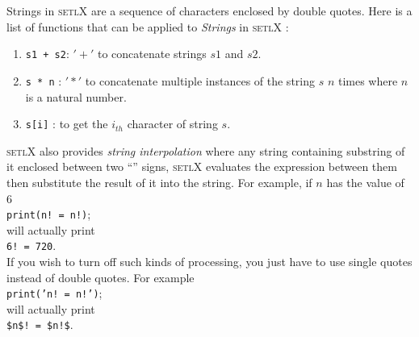 \documentclass[11pt]{article}
\begin{document}
Strings in \textsc{setlX} are a sequence of characters enclosed by double quotes. Here is a list of functions that can be applied to \textsl{Strings} in \textsc{setlX} :
\begin{enumerate}
\item \texttt{s1 + s2}: $'+'$ to concatenate strings $s1$ and $s2$.
\item \texttt{s * n} : $'*'$ to concatenate multiple instances of the string $s$ $n$ times where $n$ is a natural number.
\item \texttt{s[i]} : to get the $i_{th}$ character of string $s$.
\end{enumerate}
\textsc{setlX} also provides \textsl{string interpolation} where any string containing substring of it enclosed between two ``\texttt{}'' signs, \textsc{setlX} evaluates the expression between them then substitute the result of it into the string. For example, if $n$ has the value of $6$
\\[0.2cm]
\hspace*{1.3cm}
\texttt{print(n! = n!)};
\\[0.2cm]
will actually print
\\[0.2cm]
\hspace*{1.3cm}
\texttt{6! = 720}.
\\[0.2cm]
If you wish to turn off such kinds of processing, you just have to use single quotes instead of double quotes. For example
\\[0.2cm]
\hspace*{1.3cm}
\texttt{print('n! = n!')};
\\[0.2cm]
will actually print
\\[0.2cm]
\hspace*{1.3cm}
\texttt{\$n\$! = \$n!\$}.
\\[0.2cm]
\\
\end{document}
